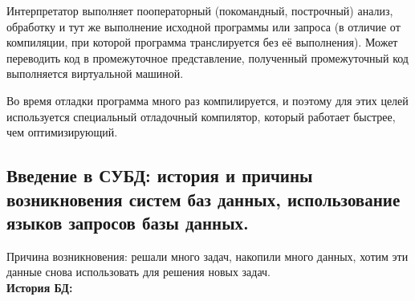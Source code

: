 \documentclass[12pt, a4paper]{article}
\begin{document}
Интерпретатор выполняет пооператорный (покомандный, построчный) анализ, обработку и тут же выполнение исходной программы или запроса (в отличие от компиляции, при которой программа транслируется без её выполнения). Может переводить код в промежуточное представление, полученный промежуточный код выполняется виртуальной машиной.

Во время отладки программа много раз компилируется, и поэтому для этих целей используется специальный отладочный компилятор, который работает быстрее, чем оптимизирующий.

\subsection{Введение в СУБД: история и причины возникновения систем баз данных, использование языков запросов базы данных.}

Причина возникновения: решали много задач, накопили много данных, хотим эти данные снова использовать для решения новых задач.\\

\textbf{История БД:}
\end{document}
